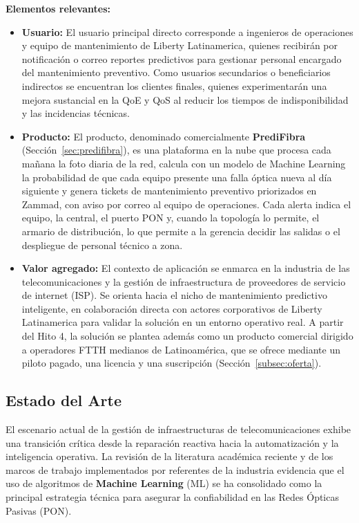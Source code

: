 \documentclass[12pt,a4paper]{article}
\begin{document}
    

    \noindent
    \textbf{Elementos relevantes:}
    \begin{itemize}
        \item \textbf{Usuario:} El usuario principal directo corresponde a ingenieros de operaciones y equipo de mantenimiento de Liberty Latinamerica, quienes recibirán por notificación o correo reportes
        predictivos para gestionar personal encargado del mantenimiento preventivo. Como usuarios secundarios o beneficiarios indirectos se encuentran los clientes finales, quienes experimentarán una mejora sustancial en la QoE
        y QoS al reducir los tiempos de indisponibilidad y las incidencias técnicas.
        \item \textbf{Producto:} El producto, denominado comercialmente \textbf{PrediFibra} (Sección~\ref{sec:predifibra}), es una plataforma en la nube que procesa cada mañana la foto diaria de la red, calcula con un modelo de Machine Learning la probabilidad de que cada equipo presente una falla óptica nueva al día siguiente y genera tickets de mantenimiento preventivo priorizados en Zammad, con aviso por correo al equipo de operaciones.
        Cada alerta indica el equipo, la central, el puerto PON y, cuando la topología lo permite, el armario de distribución, lo que permite a la gerencia decidir las salidas o el despliegue de personal técnico a zona.
        \item \textbf{Valor agregado:} El contexto de aplicación se enmarca en la industria de las telecomunicaciones y la gestión de infraestructura de proveedores de servicio de internet (ISP). Se orienta hacia el nicho de mantenimiento predictivo
        inteligente, en colaboración directa con actores corporativos de Liberty Latinamerica para validar la solución en un entorno operativo real. A partir del Hito 4, la solución se plantea además como un producto comercial dirigido a operadores FTTH medianos de Latinoamérica, que se ofrece mediante un piloto pagado, una licencia y una suscripción (Sección~\ref{subsec:oferta}). 
    \end{itemize}


    \newpage
\subsection{Estado del Arte}
\noindent
El escenario actual de la gestión de infraestructuras de telecomunicaciones exhibe una transición crítica desde la reparación reactiva hacia la automatización y la inteligencia operativa. La revisión de la literatura académica reciente y de los marcos de trabajo implementados por referentes de la industria evidencia que el uso de algoritmos 
de \textbf{Machine Learning} (ML) se ha consolidado como la principal estrategia técnica para asegurar la confiabilidad en las Redes Ópticas Pasivas (PON).
\end{document}
